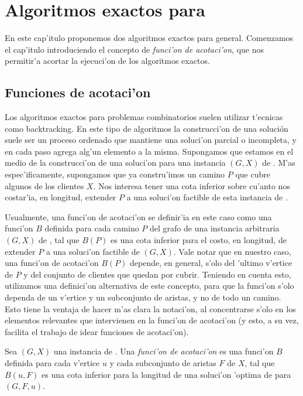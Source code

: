 \chapter{Algoritmos exactos para }
\label{ch:exactos}

En este cap'itulo proponemos dos algoritmos exactos para  general. Comenzamos el cap'itulo introduciendo el concepto de \textit{funci'on de acotaci'on}, que nos permitir'a acortar la ejecuci'on de los algoritmos exactos.

\section{Funciones de acotaci'on}

Los algoritmos exactos para problemas combinatorios suelen utilizar t'ecnicas como backtracking. En este tipo de algoritmos la construcci'on de una solución suele ser un proceso ordenado que mantiene una soluci'on parcial o incompleta, y en cada paso agrega alg'un elemento a la misma. Supongamos que estamos en el medio de la construcci'on de una soluci'on para una instancia $(G, X)$ de . M'as espec'ificamente, supongamos que ya constru'imos un camino $P$ que cubre algunos de los clientes $X$. Nos interesa tener una cota inferior sobre cu'anto nos costar'ia, en longitud, extender $P$ a una soluci'on factible de esta instancia de .

Usualmente, una funci'on de acotaci'on se definir'ia en este caso como una funci'on $B$ definida para cada camino $P$ del grafo de una instancia arbitraria $(G, X)$ de , tal que $B(P)$ es una cota inferior para el costo, en longitud, de extender $P$ a una soluci'on factible de $(G, X)$. Vale notar que en nuestro caso, una funci'on de acotaci'on $B(P)$ depende, en general, s'olo del 'ultimo v'ertice de $P$ y del conjunto de clientes que quedan por cubrir. Teniendo en cuenta esto, utilizamos una definici'on alternativa de este concepto, para que la funci'on s'olo dependa de un v'ertice y un subconjunto de aristas, y no de todo un camino. Esto tiene la ventaja de hacer m'as clara la notaci'on, al concentrarse s'olo en los elementos relevantes que intervienen en la funci'on de acotaci'on (y esto, a su vez, facilita el trabajo de idear funciones de acotaci'on).

\begin{definition}
Sea $(G, X)$ una instancia de . Una \textit{funci'on de acotaci'on} es una funci'on $B$ definida para cada v'ertice $u$ y cada subconjunto de aristas $F$ de $X$, tal que $B(u, F)$ es una cota inferior para la longitud de una soluci'on 'optima de  para $(G, F, u)$.
\end{definition}

